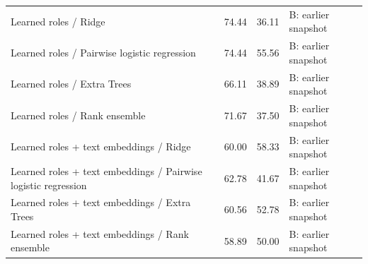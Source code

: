 \documentclass[journal]{IEEEtran}
\begin{document}
\begin{table}[t]
\begin{tabular}{p{}p{}p{}p{}}
{\raggedright Learned roles / Ridge\par} & {\raggedright 74.44\par} & {\raggedright 36.11\par} & {\raggedright B: earlier snapshot\par} \\
{\raggedright Learned roles / Pairwise logistic regression\par} & {\raggedright 74.44\par} & {\raggedright 55.56\par} & {\raggedright B: earlier snapshot\par} \\
{\raggedright Learned roles / Extra Trees\par} & {\raggedright 66.11\par} & {\raggedright 38.89\par} & {\raggedright B: earlier snapshot\par} \\
{\raggedright Learned roles / Rank ensemble\par} & {\raggedright 71.67\par} & {\raggedright 37.50\par} & {\raggedright B: earlier snapshot\par} \\
{\raggedright Learned roles + text embeddings / Ridge\par} & {\raggedright 60.00\par} & {\raggedright 58.33\par} & {\raggedright B: earlier snapshot\par} \\
{\raggedright Learned roles + text embeddings / Pairwise logistic regression\par} & {\raggedright 62.78\par} & {\raggedright 41.67\par} & {\raggedright B: earlier snapshot\par} \\
{\raggedright Learned roles + text embeddings / Extra Trees\par} & {\raggedright 60.56\par} & {\raggedright 52.78\par} & {\raggedright B: earlier snapshot\par} \\
{\raggedright Learned roles + text embeddings / Rank ensemble\par} & {\raggedright 58.89\par} & {\raggedright 50.00\par} & {\raggedright B: earlier snapshot\par} \\

\end{tabular}
\end{table}
\end{document}
